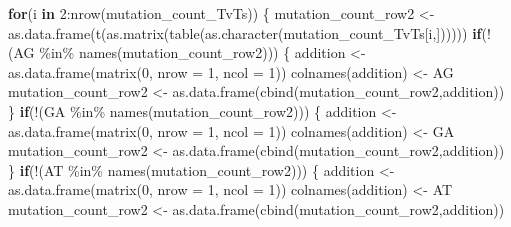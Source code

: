 \documentclass[
]{article}
\newenvironment{Shaded}{\begin{snugshade}}{\end{snugshade}}
\newcommand{\AttributeTok}[1]{\textcolor[rgb]{0.77,0.63,0.00}{#1}}
\newcommand{\ControlFlowTok}[1]{\textcolor[rgb]{0.13,0.29,0.53}{\textbf{#1}}}
\newcommand{\DecValTok}[1]{\textcolor[rgb]{0.00,0.00,0.81}{#1}}
\newcommand{\FunctionTok}[1]{\textcolor[rgb]{0.00,0.00,0.00}{#1}}
\newcommand{\NormalTok}[1]{#1}
\newcommand{\OtherTok}[1]{\textcolor[rgb]{0.56,0.35,0.01}{#1}}
\newcommand{\SpecialCharTok}[1]{\textcolor[rgb]{0.00,0.00,0.00}{#1}}
\newcommand{\StringTok}[1]{\textcolor[rgb]{0.31,0.60,0.02}{#1}}
\begin{document}
\begin{Shaded}
\begin{Highlighting}[]
\ControlFlowTok{for}\NormalTok{(i }\ControlFlowTok{in} \DecValTok{2}\SpecialCharTok{:}\FunctionTok{nrow}\NormalTok{(mutation\_count\_TvTs))}
\NormalTok{\{}
\NormalTok{  mutation\_count\_row2 }\OtherTok{\textless{}{-}} \FunctionTok{as.data.frame}\NormalTok{(}\FunctionTok{t}\NormalTok{(}\FunctionTok{as.matrix}\NormalTok{(}\FunctionTok{table}\NormalTok{(}\FunctionTok{as.character}\NormalTok{(mutation\_count\_TvTs[i,])))))}
  \ControlFlowTok{if}\NormalTok{(}\SpecialCharTok{!}\NormalTok{(}\StringTok{\textquotesingle{}AG\textquotesingle{}} \SpecialCharTok{\%in\%} \FunctionTok{names}\NormalTok{(mutation\_count\_row2)))}
\NormalTok{  \{}
\NormalTok{    addition }\OtherTok{\textless{}{-}} \FunctionTok{as.data.frame}\NormalTok{(}\FunctionTok{matrix}\NormalTok{(}\DecValTok{0}\NormalTok{, }\AttributeTok{nrow =} \DecValTok{1}\NormalTok{, }\AttributeTok{ncol =} \DecValTok{1}\NormalTok{))}
    \FunctionTok{colnames}\NormalTok{(addition) }\OtherTok{\textless{}{-}} \StringTok{\textquotesingle{}AG\textquotesingle{}}
\NormalTok{    mutation\_count\_row2 }\OtherTok{\textless{}{-}} \FunctionTok{as.data.frame}\NormalTok{(}\FunctionTok{cbind}\NormalTok{(mutation\_count\_row2,addition))}
\NormalTok{  \}}
  \ControlFlowTok{if}\NormalTok{(}\SpecialCharTok{!}\NormalTok{(}\StringTok{\textquotesingle{}GA\textquotesingle{}} \SpecialCharTok{\%in\%} \FunctionTok{names}\NormalTok{(mutation\_count\_row2)))}
\NormalTok{  \{}
\NormalTok{    addition }\OtherTok{\textless{}{-}} \FunctionTok{as.data.frame}\NormalTok{(}\FunctionTok{matrix}\NormalTok{(}\DecValTok{0}\NormalTok{, }\AttributeTok{nrow =} \DecValTok{1}\NormalTok{, }\AttributeTok{ncol =} \DecValTok{1}\NormalTok{))}
    \FunctionTok{colnames}\NormalTok{(addition) }\OtherTok{\textless{}{-}} \StringTok{\textquotesingle{}GA\textquotesingle{}}
\NormalTok{    mutation\_count\_row2 }\OtherTok{\textless{}{-}} \FunctionTok{as.data.frame}\NormalTok{(}\FunctionTok{cbind}\NormalTok{(mutation\_count\_row2,addition))}
\NormalTok{  \}}
  \ControlFlowTok{if}\NormalTok{(}\SpecialCharTok{!}\NormalTok{(}\StringTok{\textquotesingle{}AT\textquotesingle{}} \SpecialCharTok{\%in\%} \FunctionTok{names}\NormalTok{(mutation\_count\_row2)))}
\NormalTok{  \{}
\NormalTok{    addition }\OtherTok{\textless{}{-}} \FunctionTok{as.data.frame}\NormalTok{(}\FunctionTok{matrix}\NormalTok{(}\DecValTok{0}\NormalTok{, }\AttributeTok{nrow =} \DecValTok{1}\NormalTok{, }\AttributeTok{ncol =} \DecValTok{1}\NormalTok{))}
    \FunctionTok{colnames}\NormalTok{(addition) }\OtherTok{\textless{}{-}} \StringTok{\textquotesingle{}AT\textquotesingle{}}
\NormalTok{    mutation\_count\_row2 }\OtherTok{\textless{}{-}} \FunctionTok{as.data.frame}\NormalTok{(}\FunctionTok{cbind}\NormalTok{(mutation\_count\_row2,addition))}

\end{Highlighting}
\end{Shaded}
\end{document}
